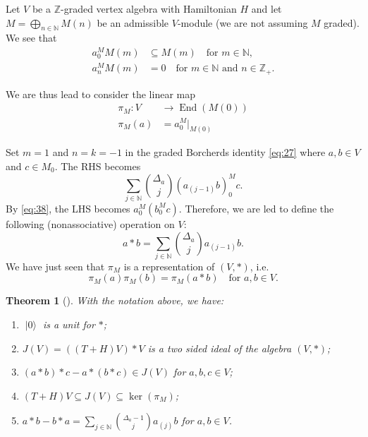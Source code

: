 \documentclass[a4paper, 12pt, reqno]{amsart}
\newtheorem{theorem}{Theorem}[section]
\theoremstyle{remark}
\numberwithin{equation}{subsection}
\DeclareMathOperator{\End}{End}
\DeclareMathOperator{\vac}{|0\rangle}
\begin{document}
Let $V$ be a $\mathbb{Z}$-graded vertex algebra with Hamiltonian $H$ and let $M = \bigoplus_{n \in \mathbb{N}} M(n)$ be an admissible $V$-module (we are not assuming $M$ graded).
We see that
\begin{equation}
  \label{eq:38}
  \begin{split}
    a^M_{0}M(m) &\subseteq M(m) \quad \text{for } m \in \mathbb{N}, \\
    a^M_{n}M(m) &= 0 \quad \text{for }m \in \mathbb{N}\text{ and }n \in \mathbb{Z}_+.
  \end{split}
\end{equation}

We are thus lead to consider the linear map
\begin{align*}
  \pi_M: V &\to \End(M(0)) \\
  \pi_M(a) &= a^M_{0}|_{M(0)}
\end{align*}

Set $m = 1$ and $n = k = -1$ in the graded Borcherds identity \eqref{eq:27} where $a, b \in V$ and $c \in M_0$.
The RHS becomes
\begin{equation*}
  \sum_{j \in \mathbb{N}}\binom{\Delta_a}{j}(a_{(j - 1)}b)^M_0c.
\end{equation*}
By \eqref{eq:38}, the LHS becomes $a^M_0(b^M_0c)$.
Therefore, we are led to define the following (nonassociative) operation on $V$:
\begin{equation*}
  a*b = \sum_{j \in \mathbb{N}}\binom{\Delta_a}{j}a_{(j - 1)}b.
\end{equation*}
We have just seen that $\pi_M$ is a representation of $(V, *)$, i.e.\
\begin{equation}
  \label{eq:39}
  \pi_M(a)\pi_M(b) = \pi_M(a*b) \quad \text{for }a, b \in V.
\end{equation}

\begin{theorem}[{\cite[\S2]{de_sole_finite_2006}}]
  \label{thr:36}
  With the notation above, we have:
  \begin{enumerate}
  \item $\vac$ is a unit for $*$;
  \item $J(V) = ((T + H)V)*V$ is a two sided ideal of the algebra $(V, *)$;
  \item $(a*b)*c - a*(b*c) \in J(V)$ for $a, b, c \in V$;
  \item $(T + H)V \subseteq J(V) \subseteq \ker(\pi_M)$;
  \item $a*b - b*a = \sum_{j \in \mathbb{N}}\binom{\Delta_a - 1}{j}a_{(j)}b$ for $a, b \in V$.
  \end{enumerate}
\end{theorem}
\end{document}
